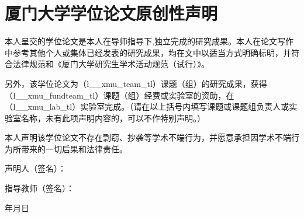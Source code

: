 \ExplSyntaxOn
\chapter*{厦门大学学位论文原创性声明}
\setcounter{page}{1}
{
本人呈交的学位论文是本人在导师指导下,独立完成的研究成果。本人在论文写作中参考其他个人或集体已经发表的研究成果，均在文中以适当方式明确标明，并符合法律规范和《厦门大学研究生学术活动规范（试行）》。\par

另外，该学位论文为（\l__xmu_team_tl）课题（组）的研究成果，获得（\l__xmu_fundteam_tl）课题（组）经费或实验室的资助，在（\l__xmu_lab_tl）实验室完成。（请在以上括号内填写课题或课题组负责人或实验室名称，未有此项声明内容的，可以不作特别声明。）\par

本人声明该学位论文不存在剽窃、抄袭等学术不端行为，并愿意承担因学术不端行为所带来的一切后果和法律责任。\par

\vspace{5ex}
{
    \raggedleft
    声明人\quad  （签名）：\phantom{六个字的空白}\par
    指导教师（签名）：\phantom{六个字的空白}\par\vspace{5ex}

    年\qquad 月\qquad 日\phantom{这七个字的空白}\par
}
}
\ExplSyntaxOff